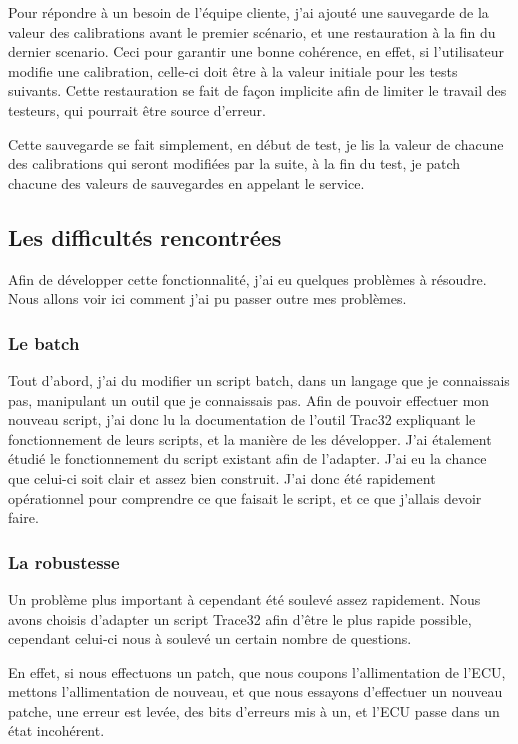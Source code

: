 	Pour répondre à un besoin de l'équipe cliente, j'ai ajouté une sauvegarde de la valeur des calibrations avant le premier scénario, et une restauration à la fin du dernier scenario. Ceci pour garantir une bonne cohérence, en effet, si l'utilisateur modifie une calibration, celle-ci doit être à la valeur initiale pour les tests suivants. Cette restauration se fait de façon implicite afin de limiter le travail des testeurs, qui pourrait être source d'erreur.
	
	Cette sauvegarde se fait simplement, en début de test, je lis la valeur de chacune des calibrations qui seront modifiées par la suite, à la fin du test, je patch chacune des valeurs de sauvegardes en appelant le service.
	
	\subsection{Les difficultés rencontrées}
	Afin de développer cette fonctionnalité, j'ai eu quelques problèmes à résoudre. Nous allons voir ici comment j'ai pu passer outre mes problèmes. 
	\subsubsection{Le batch}
	Tout d'abord, j'ai du modifier un script batch, dans un langage que je connaissais pas, manipulant un outil que je connaissais pas. Afin de pouvoir effectuer mon nouveau script, j'ai donc lu la documentation de l'outil Trac32 expliquant le fonctionnement de leurs scripts, et la manière de les développer. J'ai étalement étudié le fonctionnement du script existant afin de l'adapter. J'ai eu la chance que celui-ci soit clair et assez bien construit. J'ai donc été rapidement opérationnel pour comprendre ce que faisait le script, et ce que j'allais devoir faire.
	
	\subsubsection{La robustesse}
Un problème plus important à cependant été soulevé assez rapidement. Nous avons choisis d'adapter un script Trace32 afin d'être le plus rapide possible, cependant celui-ci nous à soulevé un certain nombre de questions.

En effet, si nous effectuons un patch, que nous coupons l'allimentation de l'ECU, mettons l'allimentation de nouveau, et que nous essayons d'effectuer un nouveau patche, une erreur est levée, des bits d'erreurs mis à un, et l'ECU passe dans un état incohérent. 

